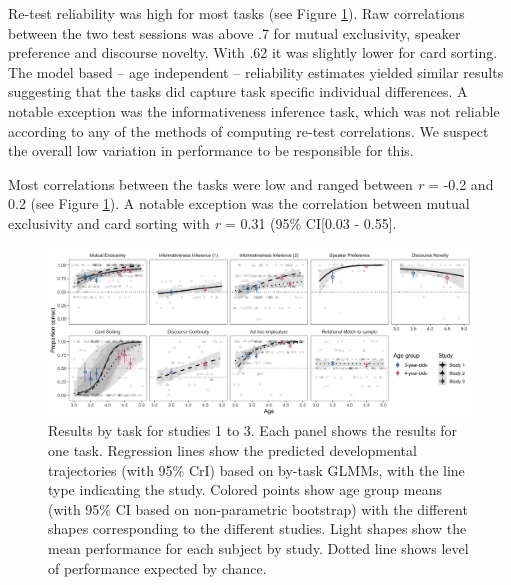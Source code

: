 \documentclass[
  english,
  man,floatsintext]{apa6}
\begin{document}
Re-test reliability was high for most tasks (see Figure \ref{fig:fig2}). Raw correlations between the two test sessions was above .7 for mutual exclusivity, speaker preference and discourse novelty. With .62 it was slightly lower for card sorting. The model based -- age independent -- reliability estimates yielded similar results suggesting that the tasks did capture task specific individual differences. A notable exception was the informativeness inference task, which was not reliable according to any of the methods of computing re-test correlations. We suspect the overall low variation in performance to be responsible for this.

Most correlations between the tasks were low and ranged between \emph{r} = -0.2 and 0.2 (see Figure \ref{fig:fig2}). A notable exception was the correlation between mutual exclusivity and card sorting with \emph{r} = 0.31 (95\% CI{[}0.03 - 0.55{]}.



\begin{figure}

{\centering \includegraphics[width=1\linewidth]{./figures/figure2} 

}

\caption{Results by task for studies 1 to 3. Each panel shows the results for one task. Regression lines show the predicted developmental trajectories (with 95\% CrI) based on by-task GLMMs, with the line type indicating the study. Colored points show age group means (with 95\% CI based on non-parametric bootstrap) with the different shapes corresponding to the different studies. Light shapes show the mean performance for each subject by study. Dotted line shows level of performance expected by chance.}\label{fig:fig2}
\end{figure}
\end{document}
